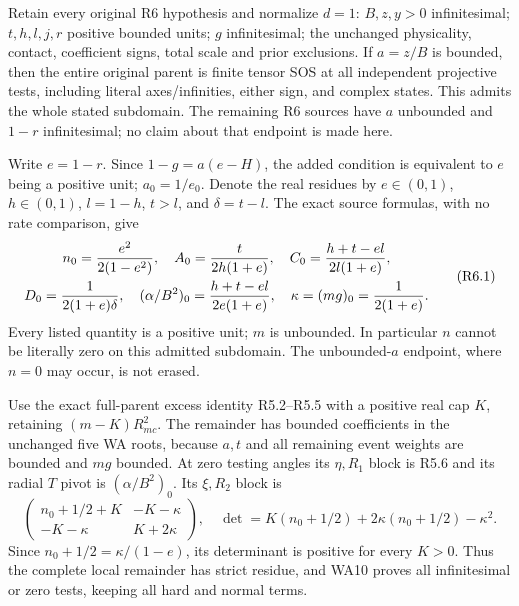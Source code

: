 \label{pd5fa361b4623:sec:r17-r6-bounded-a}
\begin{theorem}
Retain every original R6 hypothesis and normalize $d=1$: $B,z,y>0$
infinitesimal; $t,h,l,j,r$ positive bounded units; $g$ infinitesimal;
the unchanged physicality, contact, coefficient signs, total scale and
prior exclusions. If $a=z/B$ is bounded, then the entire original
parent is finite tensor SOS at all independent projective tests,
including literal axes/infinities, either sign, and complex states.
This admits the whole stated subdomain. The remaining R6 sources have
$a$ unbounded and $1-r$ infinitesimal; no claim about that endpoint is
made here.
\end{theorem}

Write $e=1-r$. Since $1-g=a(e-H)$, the added condition is equivalent
to $e$ being a positive unit; $a_0=1/e_0$. Denote the real residues
by $e\in(0,1)$, $h\in(0,1)$, $l=1-h$, $t>l$, and $\delta=t-l$.
The exact source formulas, with no rate comparison, give
\[
\begin{gathered}
 n_0={e^2\over2(1-e^2)},\quad
 A_0={t\over2h(1+e)},\quad
 C_0={h+t-el\over2l(1+e)},\\
 D_0={1\over2(1+e)\delta},\quad
 (\alpha/B^2)_0={h+t-el\over2e(1+e)},\quad
 \kappa=(mg)_0={1\over2(1+e)}.
\end{gathered}                       \tag{R6.1}
\]
Every listed quantity is a positive unit; $m$ is unbounded. In
particular $n$ cannot be literally zero on this admitted subdomain.
The unbounded-$a$ endpoint, where $n=0$ may occur, is not erased.

Use the exact full-parent excess identity R5.2--R5.5 with a positive
real cap $K$, retaining $(m-K)R_{mc}^2$. The remainder has bounded
coefficients in the unchanged five WA roots, because $a,t$ and all
remaining event weights are bounded and $mg$ bounded. At zero testing
angles its $\eta,R_1$ block is R5.6 and its radial $T$ pivot is
$(\alpha/B^2)_0$. Its $\xi,R_2$ block is
\[
 \begin{pmatrix}n_0+1/2+K&-K-\kappa\\
                 -K-\kappa&K+2\kappa\end{pmatrix},
\quad\det=K(n_0+1/2)+2\kappa(n_0+1/2)-\kappa^2.     \tag{R6.2}
\]
Since $n_0+1/2=\kappa/(1-e)$, its determinant is positive for every
$K>0$. Thus the complete local remainder has strict residue, and WA10
proves all infinitesimal or zero tests, keeping all hard and normal terms.

